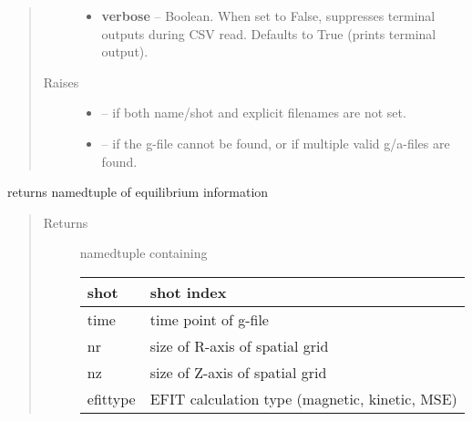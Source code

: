 \documentclass[letterpaper,10pt,english]{sphinxmanual}
\begin{document}
\begin{fulllineitems}
\begin{quote}
\begin{description}
\begin{itemize}
\item {} 
\textbf{verbose} --
Boolean.
When set to False, suppresses terminal outputs during CSV read.
Defaults to True (prints terminal output).

\end{itemize}

\item[{Raises }] \leavevmode\begin{itemize}
\item {} 
 -- 
if both name/shot and explicit filenames are not set.

\item {} 
 -- 
if the g-file cannot be found, or if multiple valid g/a-files are found.

\end{itemize}

\end{description}\end{quote}

\begin{fulllineitems}
\label{eqtools:eqtools.eqdskreader.EqdskReader.getInfo}
returns namedtuple of equilibrium information
\begin{quote}\begin{description}
\item[{Returns}] \leavevmode

namedtuple containing

\begin{tabulary}{\linewidth}{|L|L|}
\hline

shot
 & 
shot index
\\\hline

time
 & 
time point of g-file
\\\hline

nr
 & 
size of R-axis of spatial grid
\\\hline

nz
 & 
size of Z-axis of spatial grid
\\\hline

efittype
 & 
EFIT calculation type (magnetic, kinetic, MSE)
\\\hline
\end{tabulary}



\end{description}\end{quote}


\end{fulllineitems}
\end{fulllineitems}
\end{document}
